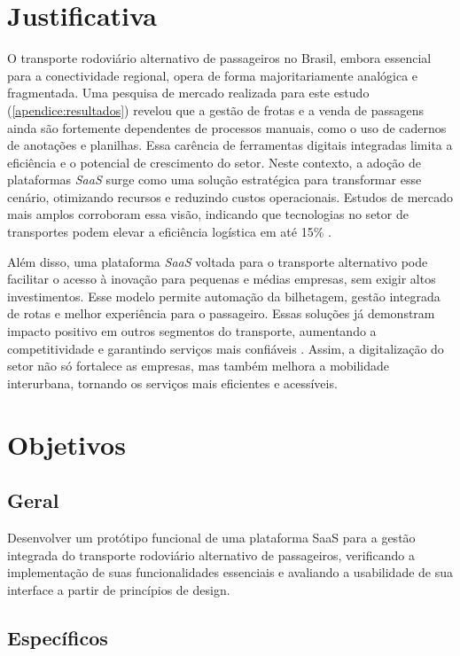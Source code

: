 \section{Justificativa}

O transporte rodoviário alternativo de passageiros no Brasil, embora essencial para a conectividade regional, opera de forma majoritariamente analógica e fragmentada. Uma pesquisa de mercado realizada para este estudo (\autoref{apendice:resultados}) revelou que a gestão de frotas e a venda de passagens ainda são fortemente dependentes de processos manuais, como o uso de cadernos de anotações e planilhas. Essa carência de ferramentas digitais integradas limita a eficiência e o potencial de crescimento do setor. Neste contexto, a adoção de plataformas \textit{SaaS} surge como uma solução estratégica para transformar esse cenário, otimizando recursos e reduzindo custos operacionais. Estudos de mercado mais amplos corroboram essa visão, indicando que tecnologias no setor de transportes podem elevar a eficiência logística em até 15\% \cite{setcepar2023}.

Além disso, uma plataforma \textit{SaaS} voltada para o transporte alternativo pode facilitar o acesso à inovação para pequenas e médias empresas, sem exigir altos investimentos. Esse modelo permite automação da bilhetagem, gestão integrada de rotas e melhor experiência para o passageiro. Essas soluções já demonstram impacto positivo em outros segmentos do transporte, aumentando a competitividade e garantindo serviços mais confiáveis \cite{prologapp2024}. Assim, a digitalização do setor não só fortalece as empresas, mas também melhora a mobilidade interurbana, tornando os serviços mais eficientes e acessíveis.

\section{Objetivos}

\subsection{Geral}

Desenvolver um protótipo funcional de uma plataforma SaaS para a gestão integrada do transporte rodoviário alternativo de passageiros, verificando a implementação de suas funcionalidades essenciais e avaliando a usabilidade de sua interface a partir de princípios de design.

\subsection{Específicos}

